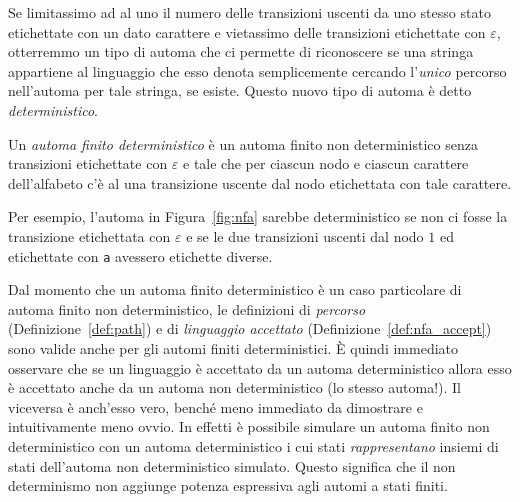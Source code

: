 Se limitassimo ad al \piu uno il numero delle transizioni uscenti da uno
stesso stato etichettate con un dato carattere e vietassimo
delle transizioni etichettate con $\varepsilon$, otterremmo un tipo di automa
che ci permette di riconoscere se una stringa appartiene al linguaggio che
esso denota semplicemente cercando l'\emph{unico} percorso nell'automa
per tale stringa, se esiste. Questo nuovo tipo di automa \`e detto
\emph{deterministico}.
%
\begin{definition}\label{def:dfa}
Un \emph{automa finito deterministico} \`e un automa finito
non deterministico senza transizioni etichettate con $\varepsilon$
e tale che per ciascun nodo e ciascun carattere
dell'alfabeto c'\`e al \piu una transizione
uscente dal nodo etichettata con tale carattere.
\end{definition}
%
\noindent
Per esempio, l'automa in Figura~\ref{fig:nfa} sarebbe deterministico se non
ci fosse la transizione etichettata con $\varepsilon$ e se le due
transizioni uscenti dal nodo $1$ ed etichettate con \texttt{a} avessero
etichette diverse.

Dal momento che un automa finito deterministico \`e un caso particolare
di automa finito non deterministico, le definizioni di \emph{percorso}
(Definizione~\ref{def:path}) e di \emph{linguaggio accettato}
(Definizione~\ref{def:nfa_accept}) sono valide anche per gli automi finiti
deterministici. \`E quindi immediato osservare che se un linguaggio \`e
accettato da un automa deterministico allora esso \`e accettato anche da un
automa non deterministico (lo stesso automa!). Il viceversa \`e anch'esso
vero, bench\'e meno immediato da dimostrare e intuitivamente meno ovvio.
In effetti \`e possibile simulare un automa finito non deterministico
con un automa deterministico i cui stati \emph{rappresentano} insiemi di
stati dell'automa non deterministico simulato. Questo significa che il
non determinismo non aggiunge potenza espressiva agli automi a stati finiti.


